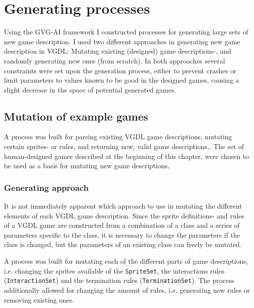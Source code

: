\documentclass[a4paper,titlepage,final]{report}
\begin{document}



\section{Generating processes}
\label{sec_task1genApproach}
Using the GVG-AI framework  I constructed processes for generating large sets of new game description.
I used two different approaches in generating new game description in VGDL: 
Mutating existing (designed) game descriptions-, and randomly generating new ones (from scratch).
In both approaches several constraints were set upon the generation process, either to prevent crashes or limit parameters to values known to be good in the designed games, causing a slight decrease in the space of potential generated games.

\subsection{Mutation of example games}
\label{ssec_task1mutation}
A process was built for parsing existing VGDL game descriptions, mutating certain sprites- or rules, and returning new, valid game descriptions,.
The set of human-designed games described at the beginning of this chapter, were chosen to be used as a basis for mutating new game descriptions.



\subsubsection*{Generating approach}
It is not immediately apparent which approach to use in mutating the different elements of  each VGDL game description.
Since the sprite definitions- and rules of a VGDL game are constructed from a combination of a class and a series of parameters specific to the class, it is necessary to change the parameters if the class is changed, but the parameters of an existing class can freely be mutated.

A process was built for mutating each of the different parts of game descriptions, i.e. changing the sprites available of the \texttt{SpriteSet}, the interactions rules (\texttt{InteractionSet}) and the termination rules (\texttt{TerminationSet}).
The process additionally allowed for changing the amount of rules, i.e. generating new rules or removing existing ones.
\end{document}
